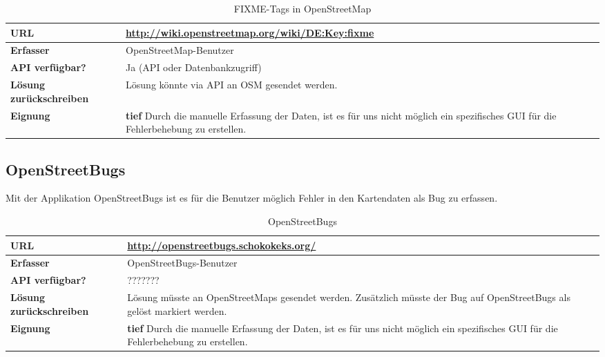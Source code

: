 \begin{table}[H]
\centering
\begin{tabular}{|p{0.25\twocelltabwidth}|p{0.75\twocelltabwidth}|}
\hline 
\small{\textbf{URL}} & \url{http://wiki.openstreetmap.org/wiki/DE:Key:fixme} \\
\hline 
\small{\textbf{Erfasser}} & OpenStreetMap-Benutzer \\
\hline 
\small{\textbf{API verfügbar?}} & Ja (API oder Datenbankzugriff) \\
\hline 
\small{\textbf{Lösung zurückschreiben}} & Lösung könnte via API an OSM gesendet werden. \\
\hline
\small{\textbf{Eignung}} & \textbf{tief} \linebreak Durch die manuelle Erfassung der Daten, ist es für uns nicht möglich ein spezifisches GUI für die Fehlerbehebung zu erstellen. \\ 
\hline 
\end{tabular} 
\caption{FIXME-Tags in OpenStreetMap}
\label{datenquellen-fixme_tags_osm}
\end{table}

\subsection{OpenStreetBugs}
Mit der Applikation OpenStreetBugs ist es für die Benutzer möglich Fehler in den Kartendaten als Bug zu erfassen.

\begin{table}[H]
\centering
\begin{tabular}{|p{0.25\twocelltabwidth}|p{0.75\twocelltabwidth}|}
\hline 
\small{\textbf{URL}} & \url{http://openstreetbugs.schokokeks.org/} \\
\hline 
\small{\textbf{Erfasser}} & OpenStreetBugs-Benutzer \\
\hline 
\small{\textbf{API verfügbar?}} & ??????? \\
\hline 
\small{\textbf{Lösung zurückschreiben}} & Lösung müsste an OpenStreetMaps gesendet werden. Zusätzlich  müsste der Bug auf OpenStreetBugs als gelöst markiert werden. \\
\hline
\small{\textbf{Eignung}} & \textbf{tief} \linebreak Durch die manuelle Erfassung der Daten, ist es für uns nicht möglich ein spezifisches GUI für die Fehlerbehebung zu erstellen. \\ 
\hline 
\end{tabular} 
\caption{OpenStreetBugs}
\label{datenquellen-openstreetbugs}
\end{table}

